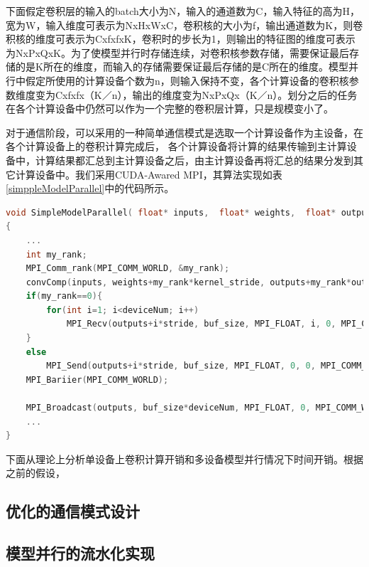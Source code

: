 下面假定卷积层的输入的batch大小为N，输入的通道数为C，输入特征的高为H，宽为W，输入维度可表示为NxHxWxC，卷积核的大小为f，输出通道数为K，则卷积核的维度可表示为CxfxfxK，卷积时的步长为1，则输出的特征图的维度可表示为NxPxQxK。为了使模型并行时存储连续，对卷积核参数存储，需要保证最后存储的是K所在的维度，而输入的存储需要保证最后存储的是C所在的维度。模型并行中假定所使用的计算设备个数为n，则输入保持不变，各个计算设备的卷积核参数维度变为Cxfxfx（K／n），输出的维度变为NxPxQx（K／n）。划分之后的任务在各个计算设备中仍然可以作为一个完整的卷积层计算，只是规模变小了。

对于通信阶段，可以采用的一种简单通信模式是选取一个计算设备作为主设备，在各个计算设备上的卷积计算完成后，
各个计算设备将计算的结果传输到主计算设备中，计算结果都汇总到主计算设备之后，由主计算设备再将汇总的结果分发到其它计算设备中。我们采用CUDA-Awared MPI，其算法实现如表\ref{simppleModelParallel}中的代码所示。

\begin{table}
\caption{基于多设备上的模型并行简单实现}
\label{simppleModelParallel}
\begin{lstlisting}[language=C++, basicstyle=\ttfamily\footnotesize]
void SimpleModelParallel( float* inputs,  float* weights,  float* outputs,  int N, int buf_size, int deviceNum, int kernel_stride, int output_stride... )
{
	...
	int my_rank;
	MPI_Comm_rank(MPI_COMM_WORLD, &my_rank);
	convComp(inputs, weights+my_rank*kernel_stride, outputs+my_rank*output_stride);
	if(my_rank==0){
		for(int i=1; i<deviceNum; i++)
			MPI_Recv(outputs+i*stride, buf_size, MPI_FLOAT, i, 0, MPI_COMM_WORLD );
	}
	else
		MPI_Send(outputs+i*stride, buf_size, MPI_FLOAT, 0, 0, MPI_COMM_WORLD);
	MPI_Bariier(MPI_COMM_WORLD);
	
	MPI_Broadcast(outputs, buf_size*deviceNum, MPI_FLOAT, 0, MPI_COMM_WORLD);
	...
}
\end{lstlisting}
\end{table}

下面从理论上分析单设备上卷积计算开销和多设备模型并行情况下时间开销。根据之前的假设，

\subsection{优化的通信模式设计}

\subsection{模型并行的流水化实现}



